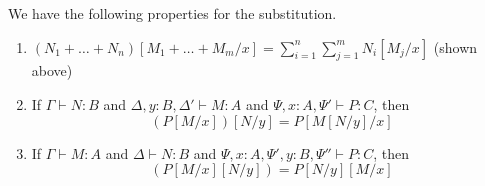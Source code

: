 \begin{lemma}
\label{lemma:subst_properties}
  We have the following properties for the substitution.
  \begin{enumerate}
    \item\label{subst_prop:a} $(N_1 + \ldots + N_n)[M_1 + \ldots + M_m / x] = \sum_{i=1}^{n}\sum_{j=1}^{m}N_i[M_j / x]$ (shown above)
    \item\label{subst_prop:b} If $\Gamma \vdash N : B$ and $\Delta, y : B, \Delta' \vdash M : A$ and $\Psi, x : A, \Psi' \vdash P : C$, then
      \[
      (P[M/x])[N/y] = P[M[N/y]/x]
      \]
    \item\label{subst_prop:c} If $\Gamma \vdash M : A$ and $\Delta \vdash N : B$ and $\Psi, x : A, \Psi', y : B, \Psi'' \vdash P : C$, then
      \[
      (P[M/x][N/y]) = P[N/y][M/x]
      \]
  \end{enumerate}
\end{lemma}
